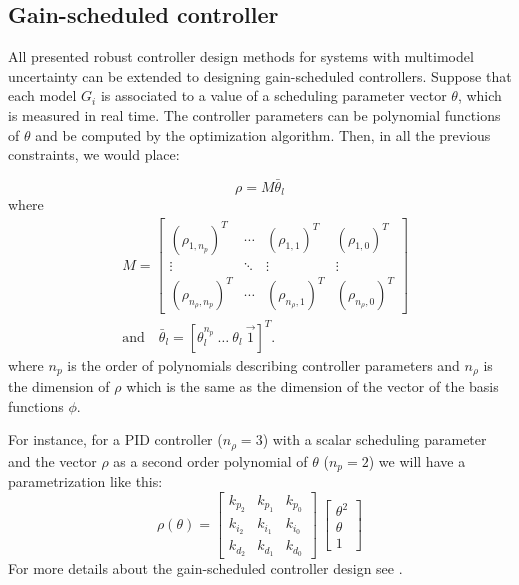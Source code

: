 \documentclass [12pt , a4paper] {article}
\begin{document}
\subsection{Gain-scheduled controller}

All presented robust controller design methods for systems with multimodel uncertainty can be extended to designing
gain-scheduled controllers. Suppose that each model $G_i$ is associated to a value of a scheduling parameter vector $\theta$, which is measured in real time. The controller parameters can be polynomial functions of $\theta$ and be computed by the optimization algorithm. Then, in all the previous constraints, we would place:

\[
\rho=M\bar{\theta}_l
\]
where
\begin{align}
\label{eq:GS}
& M=\left[ \begin{array}{cccc}
(\rho_{1,n_p})^T & \cdots & (\rho_{1,1})^T & (\rho_{1,0})^T \\ [.25 cm]
 \vdots & \ddots & \vdots & \vdots \\ [.25 cm]
(\rho_{n_\rho,n_p})^T & \cdots & (\rho_{n_\rho,1})^T & (\rho_{n_\rho,0})^T \end{array} \right] \\
& \mbox{and} \quad \bar{\theta}_l=[\theta_l^{n_p}\:  \ldots \: \theta_l \: \overrightarrow{1}]^T. \nonumber 
\end{align}
where $n_p$ is the order of polynomials describing controller parameters and $n_\rho$ is the dimension of $\rho$ which is the same as the dimension of the vector of the basis functions $\phi$.

For instance, for a PID controller ($n_\rho=3$) with a scalar scheduling parameter and the vector $\rho$ as a second order polynomial of $\theta$ ($n_p=2$) we will have a parametrization like this:
\begin{equation}
\label{eq:GSPID}
\rho(\theta)=\left[ \begin{array}{ccc}
k_{p_2} & k_{p_1} & k_{p_0} \\ [.25 cm]
k_{i_2} & k_{i_1} & k_{i_0} \\ [.25 cm]
k_{d_2} & k_{d_1} & k_{d_0} \end{array} \right] \: \left[ \begin{array}{c}
\theta^2 \\ [.25 cm]
 \theta \\ [.25 cm]
1 \end{array} \right] 
\end{equation}
For more details about the gain-scheduled controller design see \cite{KKL07e}.
\end{document}
